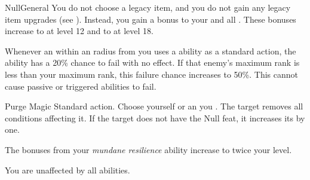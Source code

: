 \begin{feat}{Null}{General}
     You do not choose a legacy item, and you do not gain any legacy item upgrades (see ).
    Instead, you gain a  bonus to your  and all .
    These bonuses increase to  at level 12 and to  at level 18.

     Whenever an  within an \smallarea radius from you uses a \magical ability as a standard action, the ability has a 20\% chance to fail with no effect.
    If that enemy's maximum rank is less than your maximum rank, this failure chance increases to 50\%.
    This cannot cause passive or triggered abilities to fail.

    \begin{activeability}{Purge Magic}
      \abilityusagetime Standard action.
      \rankline
      Choose yourself or an  you .
      The target removes all \magical conditions affecting it.
      If the target does not have the Null feat, it increases its  by one.
    \end{activeability}

     The bonuses from your \textit{mundane resilience} ability increase to twice your level.

     You are unaffected by all \magical abilities.
  \end{feat}

